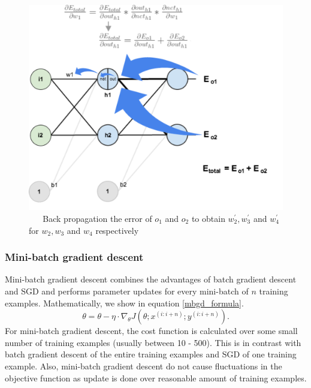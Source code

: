 \documentclass[master]{thesis-uestc}
\begin{document}
\begin{figure}[ht]
\includegraphics[width=5in]{pic/nn-calculation.png}
\caption{\,\,\,\,\,\,\,\,\,\,Back propagation the error of $o_1$ and $o_2$ to obtain $w_{2}^{\prime}, w_{3}^{\prime}$ and $w_{4}^{\prime}$ for $w_2, w_3$ and $w_4$ respectively}
\label{fig_nn-calculation}
\end{figure}

\subsubsection*{Mini-batch gradient descent}
Mini-batch gradient descent combines the advantages of batch gradient descent and SGD and performs parameter updates for every mini-batch of $n$ training examples. Mathematically, we show in equation \ref{mbgd_formula}.
\begin{equation}
    \theta = \theta - \eta \cdot \nabla_\theta J(\theta; x^{(i:i+n)}; y^{(i:i+n)}).
\label{mbgd_formula}
\end{equation}
For mini-batch gradient descent, the cost function is calculated over some small number of training examples (usually between 10 - 500). This is in contrast with batch gradient descent of the entire training examples and SGD of one training example. Also, mini-batch gradient descent do not cause fluctuations in the objective function as update is done over reasonable amount of training examples.
\end{document}
